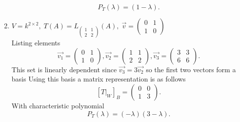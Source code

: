 \documentclass{article}
\begin{document}
\begin{enumerate}
            \[
            P_T(\lambda) = (1-\lambda)
            .\] 
        \item $V = k^{2 \times 2}, \; T(A) = L_{\begin{pmatrix} 1 & 1 \\ 2 & 2 \end{pmatrix} }(A), \; \vec{v} = \begin{pmatrix} 0 & 1 \\ 1 & 0 \end{pmatrix} $ \\
            Listing elements
            \[
                \vec{v_1} = \begin{pmatrix} 0 & 1 \\ 1 & 0 \end{pmatrix} , \vec{v_2} = \begin{pmatrix} 1 & 1 \\ 2 & 2 \end{pmatrix}, \vec{v_3} = \begin{pmatrix} 3 & 3 \\ 6 & 6 \end{pmatrix} 
            .\] 
            This set is linearly dependent  since $\vec{v_3} = 3 \vec{v_2}$ 
            so the first two vectors form a basis
            Using this basis a matrix representation is as follows
            \[
                [T|_W]_B = \begin{pmatrix} 0 & 0 \\ 1 & 3 \end{pmatrix} 
            .\] 
            With characteristic polynomial
            \[
            P_T(\lambda) = (-\lambda)(3-\lambda)
            .\] 

    \end{enumerate}
\end{document}
